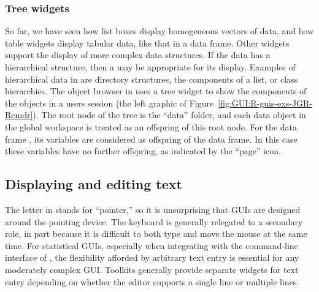     

\subsubsection{Tree widgets}
\label{sec:GUI:tree-widgets}

So far, we have seen how list boxes display homogeneous vectors of
data, and how table widgets display tabular data, like that in a data
frame. Other widgets support the display of more complex data
structures. If the data has a hierarchical structure, then a  may be appropriate for its display. Examples of hierarchical
data in \R\/ are directory structures, the components of a list, or
class hierarchies. The object browser in  uses a tree
widget to show the components of the objects in a users session (the
left graphic of Figure~\ref{fig:GUI:R-guis-exs-JGR-Rcmdr}). The root
node of the tree is the ``data'' folder, and each data object in the
global workspace is treated as an offspring of this root node. For the
data frame , its variables are considered as offspring of
the data frame. In this case these variables have no further
offspring, as indicated by the ``page'' icon.

\subsection{Displaying and editing text}
\label{sec:GUI:text-widgets}

The letter  in  stands for ``pointer,'' so it
is unsurprising that  GUIs are designed around the
pointing device. The keyboard is generally relegated to a secondary
role, in part because it is difficult to both type and move the mouse
at the same time. For statistical GUIs, especially when integrating
with the command-line interface of \R\/, the flexibility afforded by
arbitrary text entry is essential for any moderately complex
GUI. Toolkits generally provide separate widgets for text entry
depending on whether the editor supports a single line or multiple
lines.

